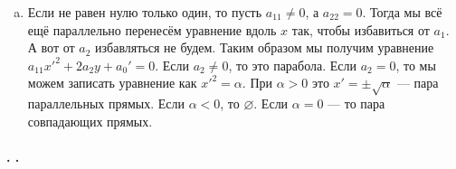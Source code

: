 \documentclass{article}
\begin{document}
\begin{itemize}
\begin{Proof}
\begin{enumerate}[1)]
\begin{enumerate}[a.]
                    \item Если не равен нулю только один, то пусть $a_{11}\neq0$, а $a_{22}=0$. Тогда мы всё ещё параллельно перенесём уравнение вдоль $x$ так, чтобы избавиться от $a_1$. А вот от $a_2$ избавляться не будем. Таким образом мы получим уравнение $a_{11}x'^2+2a_2y+a_0'=0$. Если $a_2\neq0$, то это парабола. Если $a_2=0$, то мы можем записать уравнение как $x'^2=\alpha$. При $\alpha>0$ это $x'=\pm\sqrt\alpha$ --- пара параллельных прямых. Если $\alpha<0$, то $\varnothing$. Если $\alpha=0$ --- то пара совпадающих прямых.
                \end{enumerate}
            \end{enumerate}
        \end{Proof}
    \end{itemize}
    \paragraph{. .}
\end{document}
